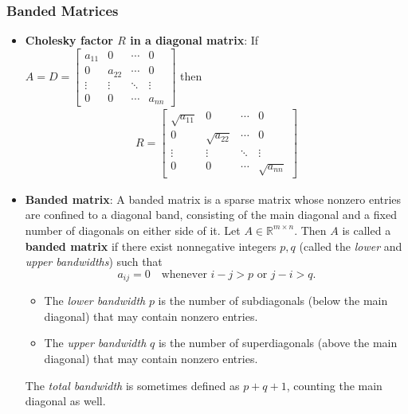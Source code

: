 \documentclass{report}
\begin{document}
    \pagebreak 
    \subsubsection{Banded Matrices}
    \begin{itemize}
        \item \textbf{Cholesky factor $R$ in a diagonal matrix}: If $A = D = \begin{bmatrix}
                a_{11} & 0 & \cdots & 0 \\
                0 & a_{22} & \cdots & 0 \\
                \vdots & \vdots & \ddots & \vdots \\
                0 & 0 & \cdots & a_{nn} 
        \end{bmatrix}$ then
        \begin{align*}
            R = \begin{bmatrix}
                \sqrt{a_{11}} & 0 & \cdots & 0 \\
                0 & \sqrt{a_{22}} & \cdots & 0 \\
                \vdots & \vdots & \ddots & \vdots \\
                0 & 0 & \cdots & \sqrt{a_{nn}}
            \end{bmatrix}
        \end{align*}
        \item \textbf{Banded matrix}: A banded matrix is a sparse matrix whose nonzero entries are confined to a diagonal band, consisting of the main diagonal and a fixed number of diagonals on either side of it.
            \bigbreak \noindent 
                Let $A \in \mathbb{R}^{m \times n}$.  
                Then $A$ is called a \textbf{banded matrix} if there exist nonnegative integers $p, q$ (called the \emph{lower} and \emph{upper bandwidths}) such that
                \[
                    a_{ij} = 0 \quad \text{whenever } i - j > p \text{ or } j - i > q.
                \]
                \begin{itemize}
                    \item The \emph{lower bandwidth} $p$ is the number of subdiagonals (below the main diagonal) that may contain nonzero entries.
                    \item The \emph{upper bandwidth} $q$ is the number of superdiagonals (above the main diagonal) that may contain nonzero entries.
                \end{itemize}
                The \emph{total bandwidth} is sometimes defined as $p + q + 1$, counting the main diagonal as well.

\end{itemize}
\end{document}
